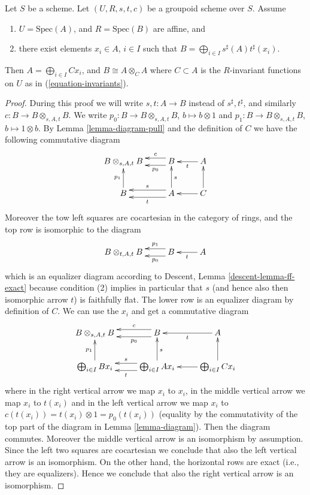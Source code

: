 \begin{lemma}
\label{lemma-basis}
Let $S$ be a scheme.
Let $(U, R, s, t, c)$ be a groupoid scheme over $S$.
Assume
\begin{enumerate}
\item $U = \text{Spec}(A)$, and $R = \text{Spec}(B)$ are affine, and
\item there exist elements $x_i \in A$, $i \in I$ such that
$B = \bigoplus_{i \in I} s^\sharp(A)t^\sharp(x_i)$.
\end{enumerate}
Then $A = \bigoplus_{i\in I} Cx_i$, and $B \cong A \otimes_C A$
where $C \subset A$ is the $R$-invariant
functions on $U$ as in (\ref{equation-invariants}).
\end{lemma}

\begin{proof}
During this proof we will write $s, t : A \to B$ instead of
$s^\sharp, t^\sharp$, and similarly $c : B \to B \otimes_{s, A, t} B$.
We write $p_0 : B \to B \otimes_{s, A, t} B$, $b \mapsto b \otimes 1$ and
$p_1 : B \to B \otimes_{s, A, t} B$, $b \mapsto 1 \otimes b$. By
Lemma \ref{lemma-diagram-pull} and the definition of $C$ we have the following
commutative diagram
$$
\xymatrix{
B \otimes_{s, A, t} B &
B \ar@<-1ex>[l]_-c \ar@<1ex>[l]^-{p_0} &
A \ar[l]^t \\
B \ar[u]^{p_1} &
A \ar@<-1ex>[l]_s \ar@<1ex>[l]^t \ar[u]_s &
C \ar[u] \ar[l]
}
$$
Moreover the tow left squares are cocartesian in the category of rings, and
the top row is isomorphic to the diagram
$$
\xymatrix{
B \otimes_{t, A, t} B &
B \ar@<-1ex>[l]_-{p_1} \ar@<1ex>[l]^-{p_0} &
A \ar[l]^t
}
$$
which is an equalizer diagram according to
Descent, Lemma \ref{descent-lemma-ff-exact} because condition (2) implies
in particular that $s$ (and hence also then isomorphic arrow $t$)
is faithfully flat.
The lower row is an equalizer diagram by definition of $C$.
We can use the $x_i$ and get a commutative diagram
$$
\xymatrix{
B \otimes_{s, A, t} B &
B \ar@<-1ex>[l]_-c \ar@<1ex>[l]^-{p_0} &
A \ar[l]^t \\
\bigoplus_{i \in I} B x_i \ar[u]^{p_1} &
\bigoplus_{i \in I} A x_i \ar@<-1ex>[l]_s \ar@<1ex>[l]^t \ar[u]_s &
\bigoplus_{i \in I} C x_i \ar[u] \ar[l]
}
$$
where in the right vertical arrow we map $x_i$ to $x_i$,
in the middle vertical arrow we map $x_i$ to $t(x_i)$ and
in the left vertical arrow we map $x_i$ to
$c(t(x_i)) = t(x_i) \otimes 1 = p_0(t(x_i))$ (equality by the commutativity
of the top part of the diagram in Lemma \ref{lemma-diagram}). Then the diagram
commutes. Moreover the middle vertical arrow is an isomorphism
by assumption. Since the left two squares are cocartesian we
conclude that also the left vertical arrow is an isomorphism.
On the other hand, the horizontal rows are exact (i.e., they are
equalizers). Hence we conclude that also the right vertical arrow
is an isomorphism.
\end{proof}

